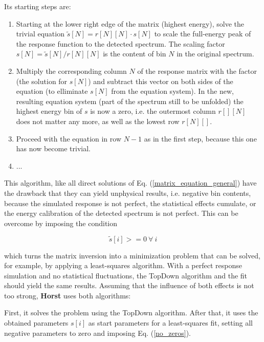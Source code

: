 \documentclass{article}
\begin{document}
Its starting steps are:

\begin{enumerate}
	\item{Starting at the lower right edge of the matrix (highest energy), solve the trivial equation $\tilde{s}[N] = r[N][N] \cdot s[N]$ to scale the full-energy peak of the response function to the detected spectrum. 
		The scaling factor $s[N]=\tilde{s}[N]/r[N][N]$ is the content of bin $N$ in the original spectrum.}
	\item{Multiply the corresponding column $N$ of the response matrix with the factor (the solution for $s[N]$) and subtract this vector on both sides of the equation (to elliminate $s[N]$ from the equation system). In the new, resulting equation system (part of the spectrum still to be unfolded) the highest energy bin of $s$ is now a zero, i.e. the outermost column $r[][N]$ does not matter any more, as well as the lowest row $r[N][]$.}
	\item{Proceed with the equation in row $N-1$ as in the first step, because this one has now become trivial.}
	\item{...}
\end{enumerate}

This algorithm, like all direct solutions of Eq. (\ref{matrix_equation_general}) have the drawback that they can yield unphysical results, i.e. negative bin contents, because the simulated response is not perfect, the statistical effects cumulate, or the energy calibration of the detected spectrum is not perfect.
This can be overcome by imposing the condition

\begin{equation}
	\label{no_zeros}
	\tilde{s}[i] >= 0 ~ \forall ~ i
\end{equation}

which turns the matrix inversion into a minimization problem that can be solved, for example, by applying a least-squares algorithm.
With a perfect response simulation and no statistical fluctuations, the TopDown algorithm and the fit should yield the same results.
Assuming that the influence of both effects is not too strong, \textbf{Horst} uses both algorithms: 

First, it solves the problem using the TopDown algorithm. After that, it uses the obtained parameters $s[i]$ as start parameters for a least-squares fit, setting all negative parameters to zero and imposing Eq. (\ref{no_zeros}).
\end{document}
